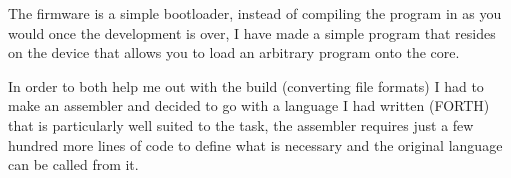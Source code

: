 \documentclass[a1paper,portrait]{baposter}
\begin{document}
\begin{poster}
{The firmware is a simple bootloader, instead of compiling the program in as you would
once the development is over, I have made a simple program that resides on the device
that allows you to load an arbitrary program onto the core. 

In order to both help me out with the build (converting file formats) I had to make
an assembler and decided to go with a language I had written (FORTH) that is particularly
well suited to the task, the assembler requires just a few hundred more lines of code
to define what is necessary and the original language can be called from it.

}

\end{poster}
\end{document}

